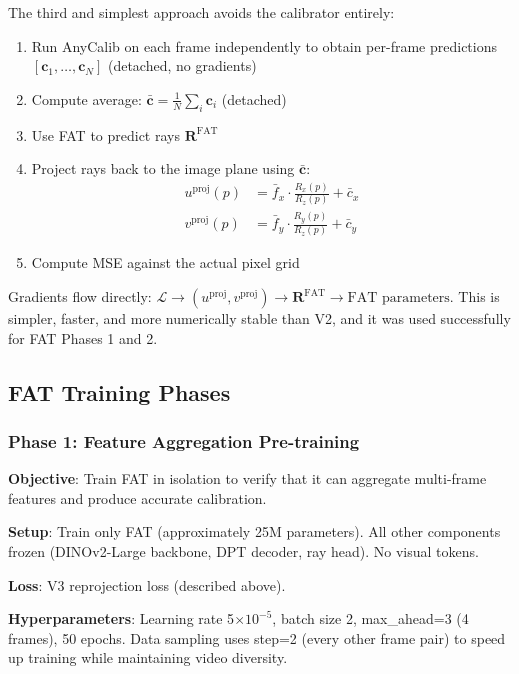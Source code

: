 The third and simplest approach avoids the calibrator entirely:

\begin{enumerate}
    \item Run AnyCalib on each frame independently to obtain per-frame predictions $[\mathbf{c}_1, \ldots, \mathbf{c}_N]$ (detached, no gradients)
    \item Compute average: $\bar{\mathbf{c}} = \frac{1}{N} \sum_i \mathbf{c}_i$ (detached)
    \item Use FAT to predict rays $\mathbf{R}^{\text{FAT}}$
    \item Project rays back to the image plane using $\bar{\mathbf{c}}$:
    \begin{align}
        u^{\text{proj}}(p) &= \bar{f}_x \cdot \frac{R_x(p)}{R_z(p)} + \bar{c}_x \\
        v^{\text{proj}}(p) &= \bar{f}_y \cdot \frac{R_y(p)}{R_z(p)} + \bar{c}_y
    \end{align}
    \item Compute MSE against the actual pixel grid
\end{enumerate}

Gradients flow directly: $\mathcal{L} \to (u^{\text{proj}}, v^{\text{proj}}) \to \mathbf{R}^{\text{FAT}} \to \text{FAT parameters}$. This is simpler, faster, and more numerically stable than V2, and it was used successfully for FAT Phases 1 and 2.

\subsection{FAT Training Phases}

\subsubsection{Phase 1: Feature Aggregation Pre-training}

\textbf{Objective}: Train FAT in isolation to verify that it can aggregate multi-frame features and produce accurate calibration.

\textbf{Setup}: Train only FAT (approximately 25M parameters). All other components frozen (DINOv2-Large backbone, DPT decoder, ray head). No visual tokens.

\textbf{Loss}: V3 reprojection loss (described above).

\textbf{Hyperparameters}: Learning rate 5$\times 10^{-5}$, batch size 2, max\_ahead=3 (4 frames), 50 epochs. Data sampling uses step=2 (every other frame pair) to speed up training while maintaining video diversity.

